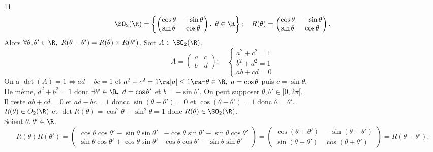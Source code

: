 \documentclass[11pt]{article}
\begin{document}
\begin{prop}{}{11}
    \begin{equation*}
        \SO_2(\R) = \left\{ \begin{pmatrix}\cos\theta&-\sin\theta\\\sin\theta&\cos\theta \end{pmatrix}, ~ \theta\in\R \right\}; \quad R(\theta) = \begin{pmatrix}\cos\theta&-\sin\theta\\\sin\theta&\cos\theta\end{pmatrix}.
    \end{equation*}
    Alors $\forall \theta,\theta'\in\R, ~ R(\theta+\theta')=R(\theta)\times R(\theta')$.
    \tcblower
    \boxed{\subset} Soit $A\in\SO_2(\R)$.
    \begin{equation*}
        A=\begin{pmatrix}a&c\\b&d\end{pmatrix}; \quad \begin{cases}a^2+c^2 = 1\\b^2+d^2=1\\ab+cd=0\end{cases}
    \end{equation*}
    On a $\det(A) = 1 \iff ad-bc = 1$ et $a^2+c^2=1 \ra |a|\leq 1 \ra \exists\theta\in\R, ~ a=\cos\theta$ puis $c=\sin\theta$.\\
    De même, $d^2+b^2=1$ donc $\exists \theta'\in\R, ~ d=\cos\theta'$ et $b=-\sin\theta'$. On peut supposer $\theta,\theta'\in[0,2\pi[$.\\
    Il reste $ab+cd = 0$ et $ad-bc=1$ doncc $\sin(\theta-\theta')=0$ et $\cos(\theta-\theta')=1$ donc $\theta=\theta'$.\\
    \boxed{\supset} $R(\theta)\in O_2(\R)$ et $\det R(\theta)=\cos^2\theta+\sin^2\theta=1$ donc $R(\theta)\in \SO_2(\R)$.\\
    Soient $\theta,\theta'\in\R$.
    \begin{equation*}
        R(\theta)R(\theta')=\begin{pmatrix}\cos\theta\cos\theta'-\sin\theta\sin\theta' & -\cos\theta\sin\theta'-\sin\theta\cos\theta'\\\sin\theta\cos\theta'+\cos\theta\sin\theta'&\cos\theta\cos\theta'-\sin\theta\sin\theta'\end{pmatrix} = \begin{pmatrix}\cos(\theta+\theta')&-\sin(\theta+\theta')\\\sin(\theta+\theta')&\cos(\theta+\theta')\end{pmatrix}=R(\theta+\theta').
    \end{equation*}
\end{prop}
\end{document}
